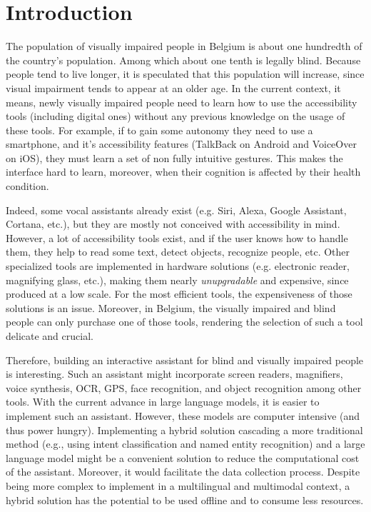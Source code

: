 \documentclass[sigconf]{acmart}
\begin{document}

\maketitle

\section{Introduction}
The population of visually impaired people in Belgium is about one hundredth of the country's population\cite{naczykEqla2020}. Among which about one tenth is legally blind. Because people tend to live longer, it is speculated that this population will increase, since visual impairment tends to appear at an older age\cite{CeciteDeficienceVisuelle2023}. In the current context, it means, newly visually impaired people need to learn how to use the accessibility tools (including digital ones) without any previous knowledge on the usage of these tools. For example, if to gain some autonomy they need to use a smartphone, and it's accessibility features (TalkBack\cite{GetStartedAndroid2023} on Android and VoiceOver\cite{ActiverVoiceOverEntrainer2023} on iOS), they must learn a set of non fully intuitive gestures. This makes the interface hard to learn, moreover, when their cognition is affected by their health condition.

Indeed, some vocal assistants already exist (e.g. Siri, Alexa, Google Assistant, Cortana, etc.), but they are mostly not conceived with accessibility in mind. However, a lot of accessibility tools exist, and if the user knows how to handle them, they help to read some text, detect objects, recognize people, etc. Other specialized tools are implemented in hardware solutions (e.g. electronic reader, magnifying glass, etc.), making them nearly \textit{unupgradable} and expensive, since produced at a low scale. For the most efficient tools, the expensiveness of those solutions is an issue. Moreover, in Belgium, the visually impaired and blind people can only purchase one of those tools, rendering the selection of such a tool delicate and crucial.

Therefore, building an interactive assistant for blind and visually impaired people is interesting. Such an assistant might incorporate screen readers, magnifiers, voice synthesis, OCR, GPS, face recognition, and object recognition among other tools. With the current advance in large language models, it is easier to implement such an assistant. However, these models are computer intensive (and thus power hungry). Implementing a hybrid solution cascading a more traditional method (e.g., using intent classification and named entity recognition) and a large language model might be a convenient solution to reduce the computational cost of the assistant. Moreover, it would facilitate the data collection process. Despite being more complex to implement in a multilingual and multimodal context, a hybrid solution has the potential to be used offline and to consume less resources.
\end{document}
